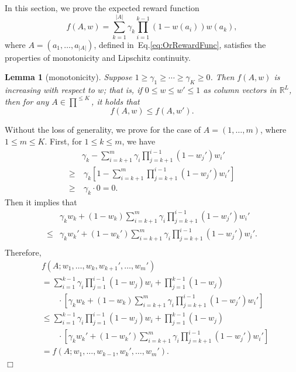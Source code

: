 \documentclass{article}
\newcommand{\RR}{\mathbb{R}}
\newcommand{\abs}[1]{\left| #1 \right|}
\newtheorem{lemma}[theorem]{Lemma}%
\newenvironment{proof}{\noindent {\textbf{Proof. }}}{$\Box$ \medskip}
\begin{document}
In this section, we prove the expected reward function
$$
f(A,w) = \sum_{k = 1}^{\abs{A}} \gamma_{k} \prod_{i=1}^{k-1} (1 - w(a_i)) w(a_k),
$$
where $A = (a_1, \ldots, a_{|A|})$, defined in~Eq.\eqref{eq:OrRewardFunc}, satisfies the properties of monotonicity and Lipschitz continuity.

\begin{lemma}[monotonicity]
	\label{lem:orMonotonicity}
	Suppose $1 \geq \gamma_1 \geq \cdots \geq \gamma_K \geq 0$. Then $f(A, w)$ is increasing with respect to $w$; that is, if $0 \leq w \leq w' \leq 1$ as column vectors in $\RR^L$, then for any $A \in \prod^{\leq K}$, it holds that
	$$
	f(A, w) \leq f(A, w').
	$$
\end{lemma}
\begin{proof}
	Without the loss of generality, we prove for the case of $A = (1, \ldots, m)$, where $1 \leq m \leq K$. First, for $1 \leq k \leq m$, we have
	\begin{align*}
		&\gamma_{k} - \sum_{i=k+1}^m \gamma_i \prod_{j = k + 1}^{i - 1} (1 - w_j') w_i'\\
		\geq &~\gamma_k [1 - \sum_{i=k+1}^m \prod_{j=k+1}^{i-1}(1 - w_j') w_i']\\
		\geq &~\gamma_{k} \cdot 0 = 0.
	\end{align*}
	Then it implies that
	\begin{align*}
		&\gamma_k w_k + (1 - w_k)\sum_{i=k+1}^m \gamma_i \prod_{j=k+1}^{i-1}(1 - w_j') w_i'\\
		\leq &\gamma_k w_k' + (1 - w_k')\sum_{i=k+1}^m \gamma_i \prod_{j=k+1}^{i-1}(1 - w_j') w_i'.\\
	\end{align*}
	Therefore, 
	\begin{align*}
		& f(A; w_1, \dots, w_k, w_{k+1}', \dots, w_m')\\
		&=\sum_{i=1}^{k-1} \gamma_i \prod_{j=1}^{i-1}(1 - w_j) w_i + \prod_{j=1}^{k-1}(1 - w_j) \\
		&\qquad \cdot [\gamma_k w_k + (1 - w_k)\sum_{i=k+1}^m \gamma_i \prod_{j=k+1}^{i-1}(1 - w_j') w_i']\\
		&\leq \sum_{i=1}^{k-1} \gamma_i \prod_{j=1}^{i-1}(1 - w_j) w_i + \prod_{j=1}^{k-1}(1 - w_j) \\
		&\qquad \cdot [\gamma_k w_k' + (1 - w_k')\sum_{i=k+1}^m \gamma_i \prod_{j=k+1}^{i-1}(1 - w_j') w_i']\\
		&=f(A; w_1, \ldots, w_{k-1}, w_{k}', \ldots, w_m').
	\end{align*}
\end{proof}
\end{document}
